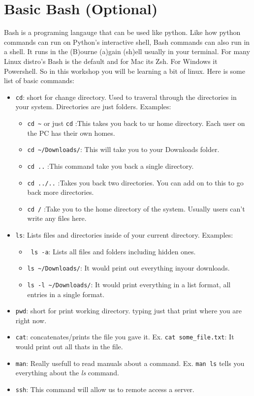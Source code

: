 \documentclass[12pt, a4paper]{article}
\begin{document}
\section{Basic Bash (Optional)}
Bash is a programing langauge that can be used like python. Like how python commands can run on Python's interactive shell, Bash commands can also run in a shell. It runs in the (B)ourne (a)gain (sh)ell usually in your terminal. For many Linux distro's Bash is the default and for Mac its Zsh. For Windows it Powershell. So in this workshop you will be learning a bit of linux. Here is some list of basic commands:
\begin{itemize}
    \item \verb`cd`: short for change directory. Used to traveral through the directories in your system. Directories are just folders. Examples:
        \begin{itemize}
            \item \verb`cd ~` or just \verb`cd` :This takes you back to ur home directory. Each user on the PC has their own homes.
            \item \verb`cd ~/Downloads/`: This will take you to your Downloads folder.
            \item \verb`cd ..` :This command take you back a single directory.
            \item \verb`cd ../..` :Takes you back two directories. You can add on to this to go back more directories.
            \item \verb`cd /`  :Take you to the home directory of the system. Usually users can't write any files here.
        \end{itemize}
    \item \verb`ls`: Lists files and directories inside of your current directory. Examples:
        \begin{itemize}
            \item \verb` ls -a`: Lists all files and folders including hidden ones.
            \item \verb`ls ~/Downloads/`: It would print out everything inyour downloads.
            \item \verb`ls -l ~/Downloads/`: It would print everything in a list format, all entries in a single format.
        \end{itemize}
    \item \verb`pwd`: short for print working directory. typing just that print where you are right now.
    \item \verb`cat`: concatenates/prints the file you gave it. Ex. \verb`cat some_file.txt`: It would print out all thats in the file.
    \item \verb`man`: Really usefull to read manuals about a command. Ex. \verb`man ls` tells you everything about the \textit{ls} command.
    \item \verb`ssh`: This command will allow us to remote access a server.
\end{itemize}
\end{document}
